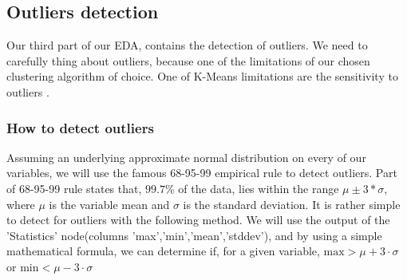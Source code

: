 \documentclass[11pt]{article}
\begin{document}
		\subsection*{Outliers detection }
			Our third part of our EDA, contains the detection of outliers. We need to carefully thing about outliers, because one of the limitations of our chosen clustering algorithm of choice. One of K-Means limitations are the sensitivity to outliers \cite{???}. 
			\subsubsection*{How to detect outliers}
				Assuming an underlying approximate normal distribution on every of our variables, we will use the famous 68-95-99 empirical rule\cite{3stddev-rule} to detect outliers. Part of 68-95-99 rule states that, $99.7\%$ of the data, lies within the range $\mu \pm 3*\sigma$, where $\mu$ is the variable mean and $\sigma$ is the standard deviation. It is rather simple to detect for outliers with the following method. We will use the output of the 'Statistics' node(columns 'max','min','mean','stddev'), and by using a simple mathematical formula, we can determine if, for a given variable, $\text{max}>\mu + 3\cdot\sigma$ or $\text{min}<\mu - 3\cdot\sigma$
\end{document}
